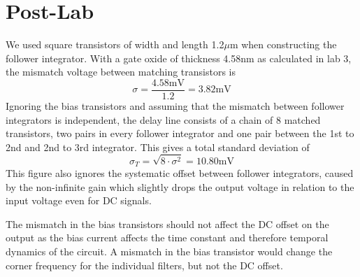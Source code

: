 

\newcommand{\reffig}[1]{Fig.~\ref{#1}}



\newpage
\section{Post-Lab}
We used square transistors of width and length 1.2\(\mu\)m when constructing the follower integrator. With a gate oxide
of thickness 4.58nm as calculated in lab 3, the mismatch voltage between matching transistors is 
\begin{equation*}
    \sigma = \frac{4.58\text{mV}}{1.2} = 3.82 \text{mV}
\end{equation*}
Ignoring the bias transistors and assuming that the mismatch between follower integrators is independent, the delay line
consists of a chain of 8 matched transistors, two pairs in every follower integrator and one pair between the 1st to 2nd and 2nd to 3rd integrator. This gives a total standard deviation of 
\begin{equation*}
    \sigma_T = \sqrt{8\cdot\sigma^2} = 10.80 \text{mV}
\end{equation*}
This figure also ignores the systematic offset between follower integrators, caused by the non-infinite gain which slightly
drops the output voltage in relation to the input voltage even for DC signals.

The mismatch in the bias transistors should not affect the DC offset on the output as the bias current affects the time constant
and therefore temporal dynamics of the circuit. A mismatch in the bias transistor would change the corner frequency for the 
individual filters, but not the DC offset.

